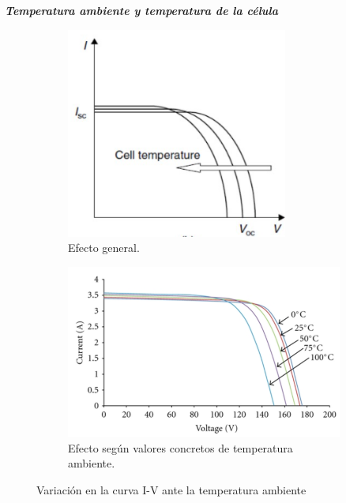\documentclass[12pt]{article}
\begin{document}
	\pagebreak
	
	\noindent \textit{\textbf{Temperatura ambiente y temperatura de la célula}} \\
	
	\begin{figure}[h]
		\begin{subfigure}{0.45\textwidth}
			\includegraphics[width=0.8\textwidth]{img/generalEffect_celTempIVcurve_solarCell.png} 
			\caption{Efecto general.}
			\label{fig: variación general en la curva I-V de una célula PV con la temperatura.}
		\end{subfigure}
		\begin{subfigure}{0.55\textwidth}
			\includegraphics[width=1\linewidth]{img/concreteEffect_TempIVcurve_solarCell.png}
			\caption{Efecto según valores concretos de temperatura ambiente.}
			\label{fig:variación con valores en la curva I-V de una célula PV con la temperatura.}
		\end{subfigure}
		\caption{Variación en la curva I-V ante la temperatura ambiente}
		\label{fig:variación I-V temperatura}
	\end{figure}
	
\end{document}
